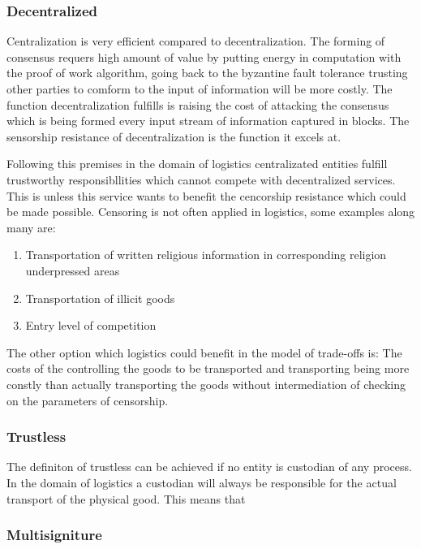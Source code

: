 \documentclass[Nomencl]{DylanMaster}
\begin{document}
\subsubsection{Decentralized}

Centralization is very efficient compared to decentralization. The forming of consensus requers high amount of value by putting energy in computation with the proof of work algorithm, going back to the byzantine fault tolerance trusting other parties to comform to the input of information will be more costly. The function decentralization fulfills is raising the cost of attacking the consensus which is being formed every input stream of information captured in blocks. The sensorship resistance of decentralization is the function it excels at.\par
Following this premises in the domain of logistics centralizated entities fulfill trustworthy responsibllities which cannot compete with decentralized services. This is unless this service wants to benefit the cencorship resistance which could be made possible. Censoring is not often applied in logistics, some examples along many are:
\begin{enumerate}
  \item Transportation of written religious information in corresponding religion underpressed areas
  \item Transportation of illicit goods
  \item Entry level of competition
\end{enumerate}
The other option which logistics could benefit in the model of trade-offs is:
The costs of the controlling the goods to be transported and transporting being more constly than actually transporting the goods without intermediation of checking on the parameters of censorship.

\subsubsection{Trustless}

The definiton of trustless can be achieved if no entity is custodian of any process. In the domain of logistics a custodian will always be responsible for the actual transport of the physical good. This means that

\subsubsection{Multisigniture}
\end{document}
